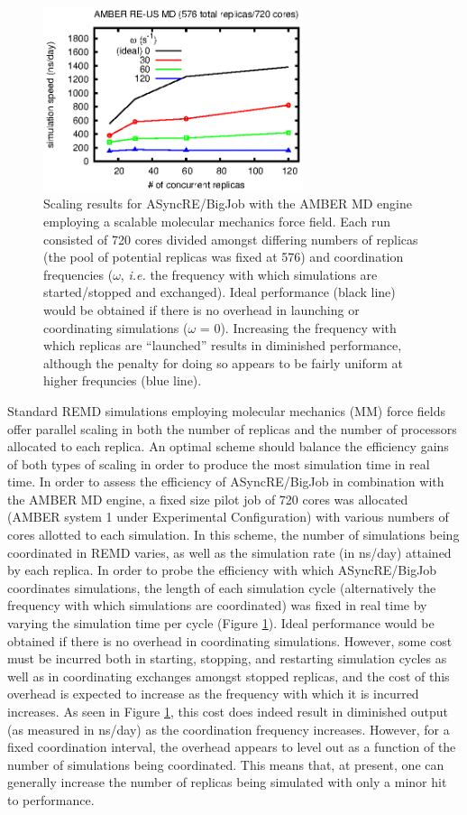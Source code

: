 \begin{figure}
\includegraphics[width=3in]{amber_data/amber_mm.eps}
\caption{
  Scaling results for ASyncRE/BigJob with the AMBER MD engine employing a
  scalable molecular mechanics force field. Each run consisted of 720 cores
  divided amongst differing numbers of replicas (the pool of potential 
  replicas was fixed at 576) and coordination frequencies ($\omega$, {\em i.e.}
  the frequency with which simulations are started/stopped and exchanged). 
  Ideal performance (black line) would be obtained if there is no overhead in 
  launching or coordinating simulations ($\omega$ = 0). Increasing the 
  frequency with which replicas are ``launched'' results in diminished 
  performance, although the penalty for doing so appears to be fairly uniform 
  at higher frequncies (blue line).
  \label{fig:amber_mm}  
}
\end{figure}

Standard REMD simulations employing molecular mechanics (MM) force fields offer 
parallel scaling in both the number of replicas and the number of processors 
allocated to each replica. An optimal scheme should balance the efficiency 
gains of both types of scaling in order to produce the most simulation time in 
real time. In order to assess the efficiency of ASyncRE/BigJob in combination 
with the AMBER MD engine, a fixed size pilot job of 720 cores was allocated 
(AMBER system 1 under Experimental Configuration) with various numbers of cores
allotted to each simulation. In this scheme, the number of simulations being 
coordinated in REMD varies, as well as the simulation rate (in ns/day) attained
by each replica. In order to probe the efficiency with which ASyncRE/BigJob 
coordinates simulations, the length of each simulation cycle (alternatively the 
frequency with which simulations are coordinated) was fixed in real time by 
varying the simulation time per cycle (Figure \ref{fig:amber_mm}). Ideal
performance would be obtained if there is no overhead in coordinating 
simulations. However, some cost must be incurred both in starting, stopping,
and restarting simulation cycles as well as in coordinating exchanges amongst 
stopped replicas, and the cost of this overhead is expected to increase as the 
frequency with which it is incurred increases. As seen in Figure 
\ref{fig:amber_mm}, this cost does indeed result in diminished output (as 
measured in ns/day) as the coordination frequency increases. However, for a
fixed coordination interval, the overhead appears to level out as a function
of the number of simulations being coordinated. This means that, at present, 
one can generally increase the number of replicas being simulated with only a
minor hit to performance.

